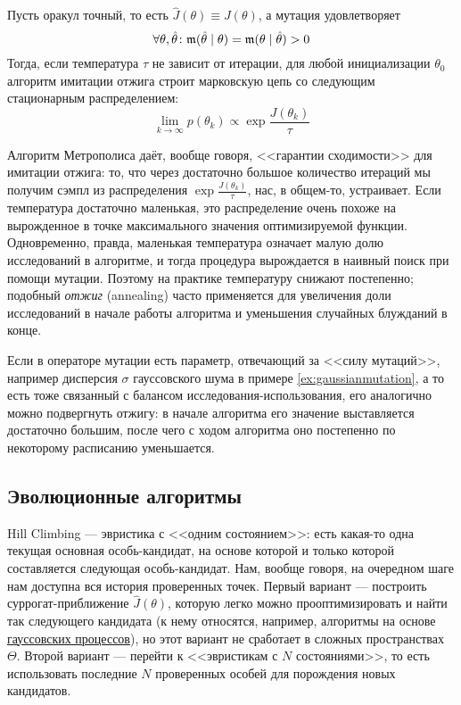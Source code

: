 \begin{proposition}
Пусть оракул точный, то есть $\hat{J}(\theta) \equiv J(\theta)$, а мутация удовлетворяет
$$\forall \theta, \hat{\theta} \colon \mut(\hat{\theta} \HM\mid \theta) = \mut(\theta \HM\mid \hat{\theta}) > 0$$
Тогда, если температура $\tau$ не зависит от итерации, для любой инициализации $\theta_0$ алгоритм имитации отжига строит марковскую цепь со следующим стационарным распределением:
$$\lim_{k \to \infty} p(\theta_k) \propto \exp \frac{J(\theta_k)}{\tau}$$
\end{proposition}

Алгоритм Метрополиса даёт, вообще говоря, <<гарантии сходимости>> для имитации отжига: то, что через достаточно большое количество итераций мы получим сэмпл из распределения $\exp \frac{J(\theta_k)}{\tau}$, нас, в общем-то, устраивает. Если температура достаточно маленькая, это распределение очень похоже на вырожденное в точке максимального значения оптимизируемой функции. Одновременно, правда, маленькая температура означает малую долю исследований в алгоритме, и тогда процедура вырождается в наивный поиск при помощи мутации. Поэтому на практике температуру снижают постепенно; подобный \emph{отжиг} (annealing) часто применяется для увеличения доли исследований в начале работы алгоритма и уменьшения случайных блужданий в конце.

\begin{example}
\begin{center}
\end{center}
\end{example}

\begin{remark}
Если в операторе мутации есть параметр, отвечающий за <<силу мутаций>>, например дисперсия $\sigma$ гауссовского шума в примере \ref{ex:gaussianmutation}, а то есть тоже связанный с балансом исследования-использования, его аналогично можно подвергнуть отжигу: в начале алгоритма его значение выставляется достаточно большим, после чего с ходом алгоритма оно постепенно по некоторому расписанию уменьшается.
\end{remark}

\subsection{Эволюционные алгоритмы}

Hill Climbing --- эвристика с <<одним состоянием>>: есть какая-то одна текущая основная особь-кандидат, на основе которой и только которой составляется следующая особь-кандидат. Нам, вообще говоря, на очередном шаге нам доступна вся история проверенных точек. Первый вариант --- построить суррогат-приближение $\hat{J}(\theta)$, которую легко можно прооптимизировать и найти так следующего кандидата (к нему относятся, например, алгоритмы на основе \href{https://distill.pub/2020/bayesian-optimization/}{гауссовских процессов}), но этот вариант не сработает в сложных пространствах $\Theta$. Второй вариант --- перейти к <<эвристикам с $N$ состояниями>>, то есть использовать последние $N$ проверенных особей для порождения новых кандидатов.

